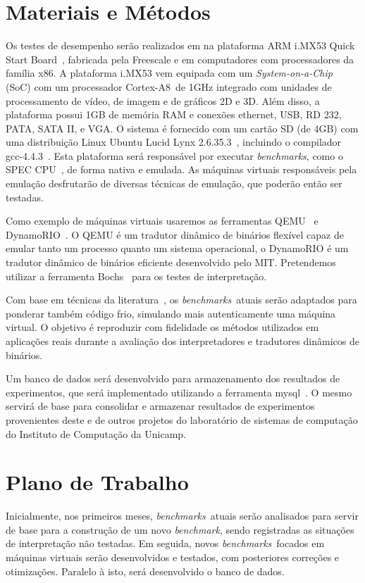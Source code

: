 \documentclass[a4paper,12pt]{article}
\newcommand{\benchmark}{\emph{benchmark}}
\newcommand{\benchmarks}{\emph{benchmarks}}
\begin{document}
\section{Materiais e Métodos}
\label{sec:mat}
Os testes de desempenho serão realizados em na plataforma ARM i.MX53 Quick Start
Board~\cite{imx53}, fabricada pela Freescale e em computadores com processadores
da família x86. A plataforma i.MX53 vem equipada com um \emph{System-on-a-Chip}
(SoC) com um processador Cortex-A8\texttrademark\ de 1GHz integrado com unidades
de processamento de vídeo, de imagem e de gráficos 2D e 3D. Além disso, a
plataforma possui 1GB de memória RAM e conexões ethernet, USB, RD 232, PATA,
SATA II, e VGA. O sistema é fornecido com um cartão SD (de 4GB) com uma
distribuição Linux Ubuntu Lucid Lynx 2.6.35.3~\cite{ubuntu}, incluindo o
compilador gcc-4.4.3~\cite{Gough_anintroduction}.  Esta plataforma será
responsável por executar \benchmarks, como o SPEC CPU~\cite{Hen00}, de forma
nativa e emulada. As máquinas virtuais responsáveis pela emulação desfrutarão de
diversas técnicas de emulação, que poderão então ser testadas.

Como exemplo de máquinas virtuais usaremos as ferramentas QEMU~\cite{qemu} e
DynamoRIO~\cite{BGA03}. O QEMU é um tradutor dinâmico de binários flexível
capaz de emular tanto um processo quanto um sistema operacional, o DynamoRIO é
um tradutor dinâmico de binários eficiente desenvolvido pelo MIT. Pretendemos
utilizar a ferramenta Bochs~\cite{boch} para os testes de interpretação.

Com base em técnicas da literatura~\cite{opt_branch,klint}, os
\benchmarks\ atuais serão adaptados para ponderar também código frio, simulando
mais autenticamente uma máquina virtual. O objetivo é reproduzir com fidelidade
os métodos utilizados em aplicações reais durante a avaliação dos
interpretadores e tradutores dinâmicos de binários.

Um banco de dados será desenvolvido para armazenamento dos resultados de
experimentos, que será implementado utilizando a ferramenta
mysql~\cite{mysql2001}.  O mesmo servirá de base para consolidar e armazenar
resultados de experimentos provenientes deste e de outros projetos do
laboratório de sistemas de computação do Instituto de Computação da Unicamp.

\section{Plano de Trabalho}
\label{sec:plano}
Inicialmente, nos primeiros meses, \benchmarks\ atuais serão analisados para
servir de base para a construção de um novo \benchmark, sendo registradas as
situações de interpretação não testadas. Em seguida, novos \benchmarks\ focados
em máquinas virtuais serão desenvolvidos e testados, com posteriores correções e
otimizações. Paralelo à isto, será desenvolvido o banco de dados.
\end{document}
